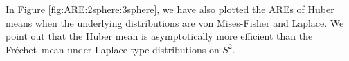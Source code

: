 \documentclass[preprint]{imsart}
\def\Frechet{Fr\'{e}chet}
\theoremstyle{plain}
\theoremstyle{remark}
\begin{document}
\begin{appendix}
 In Figure \ref{fig:ARE:2sphere:3sphere}, we have also plotted the AREs of Huber means when the underlying distributions are von Mises-Fisher and Laplace. We point out that the Huber mean is asymptotically more efficient than the \Frechet\ mean under Laplace-type distributions on $S^2$.











\end{appendix}
\end{document}

